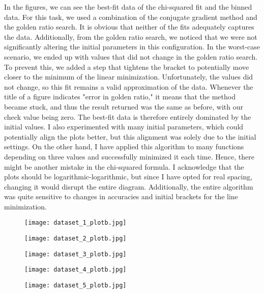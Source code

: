 In the figures, we can see the best-fit data of the chi-squared fit and the binned data. For this task, we used a combination of the conjugate gradient method and the golden ratio search. It is obvious that neither of the fits adequately captures the data. Additionally, from the golden ratio search, we noticed that we were not significantly altering the initial parameters in this configuration. In the worst-case scenario, we ended up with values that did not change in the golden ratio search. To prevent this, we added a step that tightens the bracket to potentially move closer to the minimum of the linear minimization. Unfortunately, the values did not change, so this fit remains a valid approximation of the data. Whenever the title of a figure indicates "error in golden ratio," it means that the method became stuck, and thus the result returned was the same as before, with our check value being zero. The best-fit data is therefore entirely dominated by the initial values. I also experimented with many initial parameters, which could potentially align the plots better, but this alignment was solely due to the initial settings. On the other hand, I have applied this algorithm to many functions depending on three values and successfully minimized it each time. Hence, there might be another mistake in the chi-squared formula. I acknowledge that the plots should be logarithmic-logarithmic, but since I have opted for real spacing, changing it would disrupt the entire diagram. Additionally, the entire algorithm was quite sensitive to changes in accuracies and initial brackets for the line minimization.

\begin{figure}[h!]
    \centering
    \texttt{[image: dataset\_1\_plotb.jpg]}
\end{figure}

\begin{figure}[h!]
    \centering
    \texttt{[image: dataset\_2\_plotb.jpg]}
\end{figure}

\begin{figure}[h!]
    \centering
    \texttt{[image: dataset\_3\_plotb.jpg]}
\end{figure}

\begin{figure}[h!]
    \centering
    \texttt{[image: dataset\_4\_plotb.jpg]}
\end{figure}

\begin{figure}[h!]
    \centering
    \texttt{[image: dataset\_5\_plotb.jpg]}
\end{figure}







